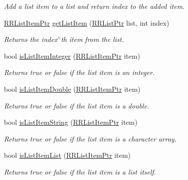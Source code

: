\begin{DoxyCompactItemize}
\begin{DoxyCompactList}\small\item\em Add a list item to a list and return index to the added item. \end{DoxyCompactList}\item 
\hyperlink{rrc__types_8h_a79938364b69256c42480bb3a29ebf73e}{R\-R\-List\-Item\-Ptr} \hyperlink{group__list_gaf1f33d11323825ab94f9318ba8b55de2}{get\-List\-Item} (\hyperlink{rrc__types_8h_a32a8a60ac06858ff3a791672bd2bec73}{R\-R\-List\-Ptr} list, int index)
\begin{DoxyCompactList}\small\item\em Returns the index$^\wedge$th item from the list. \end{DoxyCompactList}\item 
bool \hyperlink{group__list_gab2569fd6833d5fee7e30efd3a41543e3}{is\-List\-Item\-Integer} (\hyperlink{rrc__types_8h_a79938364b69256c42480bb3a29ebf73e}{R\-R\-List\-Item\-Ptr} item)
\begin{DoxyCompactList}\small\item\em Returns true or false if the list item is an integer. \end{DoxyCompactList}\item 
bool \hyperlink{group__list_ga2c763671f6abbbe6b467dc6fd38cbb27}{is\-List\-Item\-Double} (\hyperlink{rrc__types_8h_a79938364b69256c42480bb3a29ebf73e}{R\-R\-List\-Item\-Ptr} item)
\begin{DoxyCompactList}\small\item\em Returns true or false if the list item is a double. \end{DoxyCompactList}\item 
bool \hyperlink{group__list_gaeffbde1640953b8ab54725edb9db5474}{is\-List\-Item\-String} (\hyperlink{rrc__types_8h_a79938364b69256c42480bb3a29ebf73e}{R\-R\-List\-Item\-Ptr} item)
\begin{DoxyCompactList}\small\item\em Returns true or false if the list item is a character array. \end{DoxyCompactList}\item 
bool \hyperlink{group__list_ga7adc281139a5571239beaf3fb4b42b47}{is\-List\-Item\-List} (\hyperlink{rrc__types_8h_a79938364b69256c42480bb3a29ebf73e}{R\-R\-List\-Item\-Ptr} item)
\begin{DoxyCompactList}\small\item\em Returns true or false if the list item is a list itself. \end{DoxyCompactList}\item 

\end{DoxyCompactItemize}
